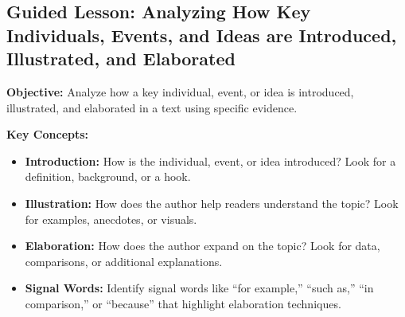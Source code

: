 \documentclass[12pt]{article}
\begin{document}
\subsection*{Guided Lesson: Analyzing How Key Individuals, Events, and Ideas are Introduced, Illustrated, and Elaborated}
\onehalfspacing

\begin{tcolorbox}[colframe=black!40, colback=gray!5, 
coltitle=black, colbacktitle=black!20, fonttitle=\bfseries\Large, 
title=Learning Objective, halign title=center, left=5pt, right=5pt, top=5pt, bottom=15pt]
\textbf{Objective:} Analyze how a key individual, event, or idea is introduced, illustrated, and elaborated in a text using specific evidence.
\end{tcolorbox}

\vspace{1em}

\begin{tcolorbox}[colframe=black!60, colback=white, 
coltitle=black, colbacktitle=black!15, fonttitle=\bfseries\Large, 
title=Key Concepts and Vocabulary, halign title=center, left=10pt, right=10pt, top=10pt, bottom=15pt]
\textbf{Key Concepts:}
\begin{itemize}
    \item \textbf{Introduction:} How is the individual, event, or idea introduced? Look for a definition, background, or a hook.
    \item \textbf{Illustration:} How does the author help readers understand the topic? Look for examples, anecdotes, or visuals.
    \item \textbf{Elaboration:} How does the author expand on the topic? Look for data, comparisons, or additional explanations.
    \item \textbf{Signal Words:} Identify signal words like “for example,” “such as,” “in comparison,” or “because” that highlight elaboration techniques.
\end{itemize}
\end{tcolorbox}

\vspace{8cm}
\end{document}
